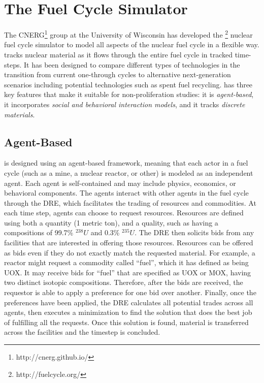 \section{The \Cyclus Fuel Cycle Simulator}
\label{s_methods}

The \gls{CNERG}\footnote{http://cnerg.github.io/} group at the University of Wisconsin has developed the \Cyclus\footnote{http://fuelcycle.org/} nuclear fuel cycle simulator to model all aspects of the nuclear fuel cycle in a flexible way\cite{cyclus_v1_0,cyclus_v1_2,cyclus_v1_3}.  \Cyclus tracks nuclear material as it flows through the entire fuel cycle in tracked time-steps. It has been designed to compare different types of technologies in the transition from current one-through cycles to alternative next-generation scenarios including potential technologies such as spent fuel recycling. \Cyclus has three key features that make it suitable for non-proliferation studies: it is \emph{agent-based}, it incorporates \emph{social and behavioral interaction models}, and it tracks \emph{discrete materials}.

\subsection{Agent-Based}
\Cyclus is designed using an agent-based framework, meaning that each actor in a fuel cycle (such as a mine, a nuclear reactor, or other) is modeled as an independent agent\cite{jennings_agent-based_2000, taylor2014agent}. Each agent is self-contained and may include physics, economics, or behavioral components\cite{huff_open_2011,gidden_agent-based_2013,gidden_agent-based_2015}.  The agents interact with other agents in the fuel cycle through the \gls{DRE}, which facilitates the trading of resources and commodities\cite{gidden_agent-based_2014}.  At each time step, agents can choose to request resources.  Resources are defined using both a quantity (1 metric ton), and a quality, such as having a compositions of 99.7\% $^{238}U$ and 0.3\% $^{235}U$.  The \gls{DRE} then solicits bids from any facilities that are interested in offering those resources. Resources can be offered as bids even if they do not exactly match the requested material. For example, a reactor might request a commodity called ``fuel'', which it has defined as being \gls{UOX}.  It may receive bids for ``fuel'' that are specified as \gls{UOX} or \gls{MOX}, having two distinct isotopic compositions. Therefore, after the bids are received, the requestor is able to apply a preference for one bid over another. Finally, once the preferences have been applied, the \gls{DRE} calculates all potential trades across all agents, then executes a minimization to find the solution that does the best job of fulfilling all the requests.  Once this solution is found, material is transferred across the facilities and the timestep is concluded.

